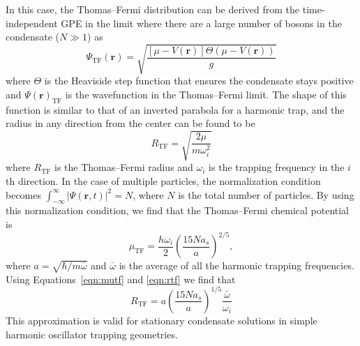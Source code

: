 In this case, the Thomas--Fermi distribution can be derived from the time-independent GPE in the limit where there are a large number of bosons in the condensate ($N \gg 1$) as~\cite{ueda2010}
\begin{equation}
\Psi_\text{TF}(\mathbf{r}) = \sqrt{\frac{[\mu-V(\mathbf{r})]\Theta(\mu-V(\mathbf{r}))}{g}}
\end{equation}
\noindent where $\Theta$ is the Heaviside step function that ensures the condensate stays positive and $\Psi(\mathbf{r})_\text{TF}$ is the wavefunction in the Thomas--Fermi limit.
The shape of this function is similar to that of an inverted parabola for a harmonic trap, and the radius in any direction from the center can be found to be
\begin{equation}
R_\text{TF} = \sqrt{\frac{2\mu}{m\omega_i^2}}
\label{eqn:rtf}
\end{equation}
\noindent where $R_\text{TF}$ is the Thomas--Fermi radius and $\omega_i$ is the trapping frequency in the $i$th direction.
In the case of multiple particles, the normalization condition becomes $\int_{-\infty}^\infty |\Psi(\mathbf{r},t)|^2 = N$, where $N$ is the total number of particles.
By using this normalization condition, we find that the Thomas--Fermi chemical potential is
\begin{equation}
\mu_\text{TF} = \frac{h\omega_i}{2}\left(\frac{15 N a_s}{a} \right)^{2/5},
\label{eqn:mutf}
\end{equation}
\noindent where $a=\sqrt{\hbar/m\bar\omega}$ and $\bar \omega$ is the average of all the harmonic trapping frequencies.
Using Equations~\eqref{eqn:mutf} and \eqref{eqn:rtf} we find that
\begin{equation}
R_\text{TF} = a\left(\frac{15 N a_s}{a} \right)^{1/5}\frac{\bar \omega}{\omega_i}
\end{equation}
This approximation is valid for stationary condensate solutions in simple harmonic oscillator trapping geometries.

